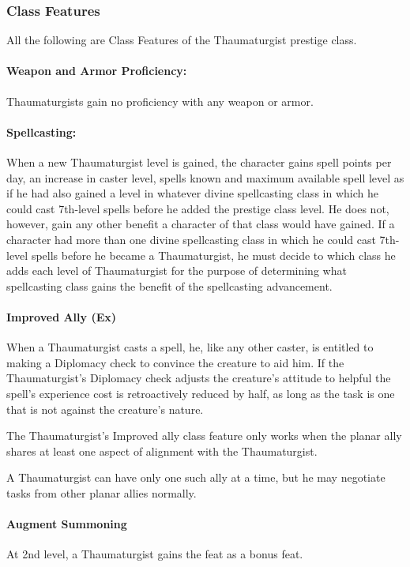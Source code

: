 \subsubsection{Class Features}
All the following are Class Features of the Thaumaturgist prestige class.

\paragraph{Weapon and Armor Proficiency:} Thaumaturgists gain no proficiency with any weapon or armor.

\paragraph{Spellcasting:} When a new Thaumaturgist level is gained, the character gains spell points per day, an increase in caster level, spells known and maximum available spell level as if he had also gained a level in whatever divine spellcasting class in which he could cast 7th-level spells before he added the prestige class level. 
He does not, however, gain any other benefit a character of that class would have gained. 
If a character had more than one divine spellcasting class in which he could cast 7th-level spells before he became a Thaumaturgist, he must decide to which class he adds each level of Thaumaturgist for the purpose of determining what spellcasting class gains the benefit of the spellcasting advancement.

\paragraph{Improved Ally (Ex)}
When a Thaumaturgist casts a  spell, he, like any other caster, is entitled to making a Diplomacy check to convince the creature to aid him. If the Thaumaturgist's Diplomacy check adjusts the creature's attitude to helpful the spell's experience cost is retroactively reduced by half, as long as the task is one that is not against the creature's nature.

The Thaumaturgist's Improved ally class feature only works when the planar ally shares at least one aspect of alignment with the Thaumaturgist.

A Thaumaturgist can have only one such ally at a time, but he may negotiate tasks from other planar allies normally.

\paragraph{Augment Summoning}
At 2nd level, a Thaumaturgist gains the  feat as a bonus feat.

